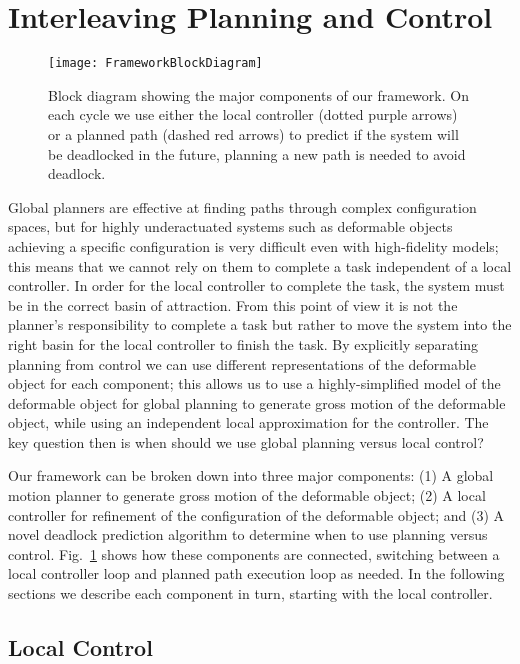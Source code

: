 \section{Interleaving Planning and Control}


\begin{figure}[t]
    \centering
    \texttt{[image: FrameworkBlockDiagram]}
    \caption{Block diagram showing the major components of our framework. On each cycle we use either the local controller (dotted purple arrows) or a planned path (dashed red arrows) to predict if the system will be deadlocked in the future, planning a new path is needed to avoid deadlock.}
    \label{fig:main_loop_diagram}
\end{figure}

Global planners are effective at finding paths through complex configuration spaces, but for highly underactuated systems such as deformable objects achieving a specific configuration is very difficult even with high-fidelity models; this means that we cannot rely on them to complete a task independent of a local controller. In order for the local controller to complete the task, the system must be in the correct basin of attraction. From this point of view it is not the planner's responsibility to complete a task but rather to move the system into the right basin for the local controller to finish the task. By explicitly separating planning from control we can use different representations of the deformable object for each component; this allows us to use a highly-simplified model of the deformable object for global planning to generate gross motion of the deformable object, while using an independent local approximation for the controller. The key question then is when should we use global planning versus local control?

Our framework can be broken down into three major components: (1) A global motion planner to generate gross motion of the deformable object; (2) A local controller for refinement of the configuration of the deformable object; and (3) A novel deadlock prediction algorithm to determine when to use planning versus control. Fig.~\ref{fig:main_loop_diagram} shows how these components are connected, switching between a local controller loop and planned path execution loop as needed. In the following sections we describe each component in turn, starting with the local controller.


\subsection{Local Control}
\label{sec:local_control}

